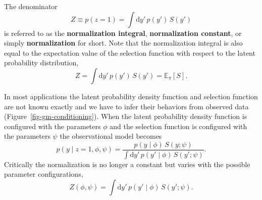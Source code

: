 \documentclass[
  letterpaper,
  DIV=11,
  numbers=noendperiod]{scrartcl}
\begin{document}
The denominator \[
Z \equiv p(z = 1) = \int \mathrm{d}y' \, p(y') \, S(y')
\] is referred to as the \textbf{normalization integral},
\textbf{normalization constant}, or simply \textbf{normalization} for
short. Note that the normalization integral is also equal to the
expectation value of the selection function with respect to the latent
probability distribution, \[
Z = \int \mathrm{d}y' \, p(y') \, S(y') = \mathbb{E}_{\pi}[S].
\]

In most applications the latent probability density function and
selection function are not known exactly and we have to infer their
behaviors from observed data (Figure~\ref{fig-gm-conditioning}). When
the latent probability density function is configured with the
parameters \(\phi\) and the selection function is configured with the
parameters \(\psi\) the observational model becomes \[
p(y \mid z = 1, \phi, \psi)
=
\frac{ p(y \mid \phi) \, S(y; \psi)  }
{ \int \mathrm{d}y' \, p(y' \mid \phi) \, S(y'; \psi) }.
\] Critically the normalization is no longer a constant but varies with
the possible parameter configurations, \[
Z(\phi, \psi) = \int \mathrm{d}y' \, p(y' \mid \phi) \, S(y'; \psi).
\]
\end{document}
